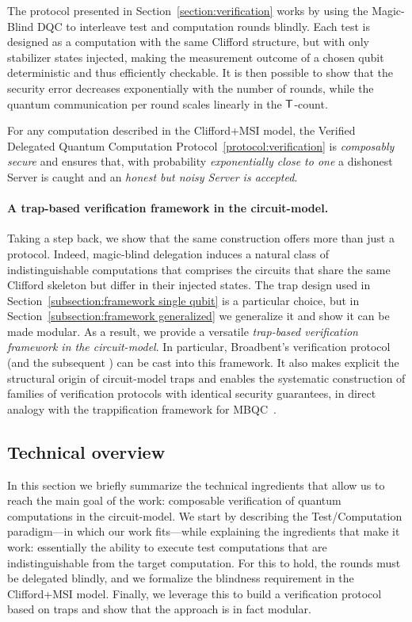 The protocol presented in Section~\ref{section:verification} works by using the Magic-Blind DQC to interleave test and computation rounds blindly. Each test is designed as a computation with the same Clifford structure, but with only stabilizer states injected, making the measurement outcome of a chosen qubit deterministic and thus efficiently checkable. It is then possible to show that the security error decreases exponentially with the number of rounds, while the quantum communication per round scales linearly in the $\mathsf{T}$-count.

\setcounter{theorem}{5}
\begin{theorem}
    For any computation described in the Clifford+MSI model,
    the Verified Delegated Quantum Computation Protocol~\ref{protocol:verification}
    is \emph{composably secure}  and
    ensures that, with probability \emph{exponentially close to one} a dishonest Server is caught and an \emph{honest but noisy Server is accepted}.
  \end{theorem}

\paragraph{A trap-based verification framework in the circuit-model.}
Taking a step back, we show that the same construction offers more than just a protocol. Indeed, magic-blind delegation induces a natural class of indistinguishable computations that comprises the circuits that share the same Clifford skeleton but differ in their injected states. The trap design used in Section~\ref{subsection:framework single qubit} is a particular choice, but in Section~\ref{subsection:framework generalized} we generalize it and show it can be made modular. As a result, we provide a versatile \emph{trap-based verification framework in the circuit-model}. In particular, Broadbent’s verification protocol~\cite{B18how} (and the subsequent \cite{BN25noise}) can be cast into this framework. It also makes explicit the structural origin of circuit-model traps and enables the systematic construction of families of verification protocols with identical security guarantees, in direct analogy with the trappification framework for MBQC~\cite{KKLM22unifying}.

\subsection{Technical overview}
In this section we briefly summarize the technical ingredients that allow us to reach the main goal of the work: composable verification of quantum computations in the circuit-model. We start by describing the Test/Computation paradigm---in which our work fits---while explaining the ingredients that make it work: essentially the ability to execute test computations that are indistinguishable from the target computation. For this to hold, the rounds must be delegated blindly, and we formalize the blindness requirement in the Clifford+MSI model. Finally, we leverage this to build a verification protocol based on traps and show that the approach is in fact modular.

